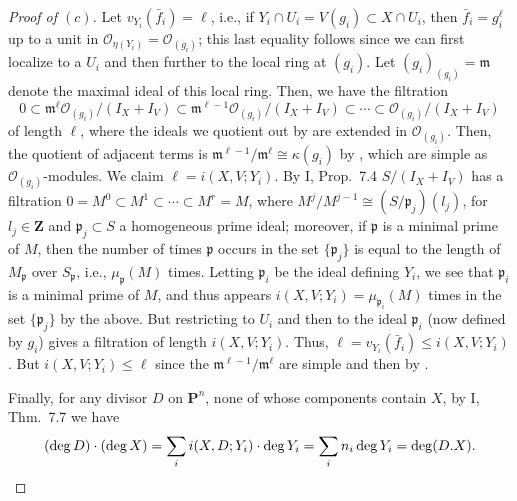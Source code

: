 \documentclass[10pt]{article}
\theoremstyle{definition}
\theoremstyle{remark}
\numberwithin{equation}{section}
\numberwithin{figure}{subsubsection}
\newcommand{\OO}{\mathcal{O}}
\begin{document}
\begin{proof}[Proof of $(c)$]
  Let $v_{Y_i}(\bar{f}_i) = \ell$, i.e., if $Y_i \cap U_i = V(g_i) \subset X \cap U_i$, then $\bar{f}_i = g_i^\ell$ up to a unit in $\OO_{\eta(Y_i)} = \OO_{(g_i)}$; this last equality follows since we can first localize to a $U_i$ and then further to the local ring at $(g_i)$. Let $(g_i)_{(g_i)} = \mathfrak{m}$ denote the maximal ideal of this local ring. Then, we have the filtration
  \begin{equation}\label{filtr}
    0 \subset \mathfrak{m}^\ell\OO_{(g_i)}/(I_X + I_V) \subset \mathfrak{m}^{\ell-1}\OO_{(g_i)}/(I_X + I_V) \subset \cdots \subset \OO_{(g_i)}/(I_X + I_V)
  \end{equation}
  of length $\ell$, where the ideals we quotient out by are extended in $\OO_{(g_i)}$. Then, the quotient of adjacent terms is $\mathfrak{m}^{\ell-1}/\mathfrak{m}^\ell \cong \kappa(g_i)$ by \cite[Prop.~$2.1i$]{AM69}, which are simple as $\OO_{(g_i)}$-modules. We claim $\ell = i(X,V;Y_i)$. By I, Prop.~7.4 $S/(I_X + I_V)$ has a filtration $0 = M^0 \subset M^1 \subset \cdots \subset M^r = M$, where $M^j/M^{j-1} \cong (S/\mathfrak{p}_j)(l_j)$, for $l_j \in \mathbf{Z}$ and $\mathfrak{p}_j \subset S$ a homogeneous prime ideal; moreover, if $\mathfrak{p}$ is a minimal prime of $M$, then the number of times $\mathfrak{p}$ occurs in the set $\{\mathfrak{p}_j\}$ is equal to the length of $M_\mathfrak{p}$ over $S_\mathfrak{p}$, i.e., $\mu_{\mathfrak{p}}(M)$ times. Letting $\mathfrak{p}_i$ be the ideal defining $Y_i$, we see that $\mathfrak{p}_i$ is a minimal prime of $M$, and thus appears $i(X,V;Y_i) = \mu_{\mathfrak{p}_i}(M)$ times in the set $\{\mathfrak{p}_j\}$ by the above. But restricting to $U_i$ and then to the ideal $\mathfrak{p}_i$ (now defined by $g_i$) gives a filtration of length $i(X,V;Y_i)$. Thus, $\ell = v_{Y_i}(\bar{f}_i) \le i(X,V;Y_i)$. But $i(X,V;Y_i) \le \ell$ since the $\mathfrak{m}^{\ell-1}/\mathfrak{m}^\ell$ are simple and then by \cite[Prop.~6.7]{AM69}.
  \par Finally, for any divisor $D$ on $\mathbf{P}^n$, none of whose components contain $X$, by I, Thm.~7.7 we have
  \begin{equation*}
    (\deg D) \cdot (\deg X) = \sum_i i(X,D;Y_i) \cdot \deg Y_i = \sum_i n_i \deg Y_i = \deg(D.X).\qedhere
  \end{equation*}
\end{proof}
\end{document}
